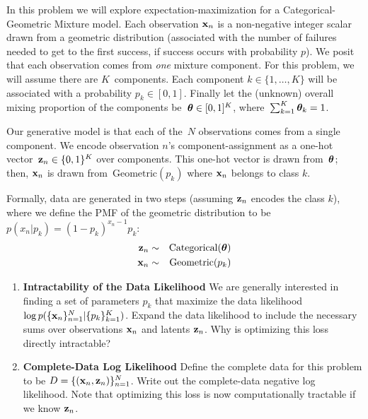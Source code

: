 \documentclass[submit]{harvardml}
\begin{document}
\begin{problem}

In this problem we will explore expectation-maximization for a
Categorical-Geometric Mixture model.  Each observation $\mathbf{x}_n$ is a
non-negative integer scalar drawn from a geometric distribution
(associated with the number of failures needed to get to the first
success, if success occurs with probability $p$).  We posit that each
observation comes from \emph{one} mixture component.  For this
problem, we will assume there are $K$~components. Each component $k
\in \{1, \ldots, K\}$ will be associated with a probability $p_k \in
    [0,1]$.  Finally let the (unknown) overall mixing proportion of
    the components be~$\boldsymbol{\theta} \in [0,1]^K$, where~${\sum_{k=1}^K
      \boldsymbol{\theta}_k=1}$.

Our generative model is that each of the~$N$ observations comes from a
single component.  We encode observation $n$'s component-assignment as
a one-hot vector~${\mathbf{z}_n \in \{0,1\}^K}$ over components. This
one-hot vector is drawn from~$\boldsymbol{\theta}$; then, $\mathbf{x}_n$ is drawn
from~$\text{Geometric}(p_k )$ where $\mathbf{x}_n$ belongs to class $k$.

Formally, data are generated in two steps (assuming $\mathbf{z}_n$ encodes
the class $k$), where we define the PMF of the geometric distribution to be $p(x_n | p_k) = (1 - p_k)^{x_n - 1} p_k$:
\begin{eqnarray*}
 \mathbf{z}_n &\sim& \text{Categorical}(\boldsymbol{\theta}) \\
 \mathbf{x}_n &\sim& \text{Geometric}(p_k )
\end{eqnarray*}

  \begin{enumerate}

  \item \textbf{Intractability of the Data Likelihood} We are
    generally interested in finding a set of parameters $p_k$ that
    maximize the data likelihood $\log
    p(\{\mathbf{x}_n\}^N_{n=1}|\{p_k\}^K_{k = 1})$.  Expand the data
    likelihood to include the necessary sums over observations
    $\mathbf{x}_n$ and latents $\mathbf{z}_n$.  Why is optimizing this loss
    directly intractable?

\item \textbf{Complete-Data Log Likelihood} Define the complete data
  for this problem to be $D = \{(\mathbf{x}_n, \mathbf{z}_n)\}_{n=1}^N$. Write
  out the complete-data negative log likelihood. Note that optimizing
  this loss is now computationally tractable if we know $\mathbf{z}_n$.


\end{enumerate}
\end{problem}
\end{document}
